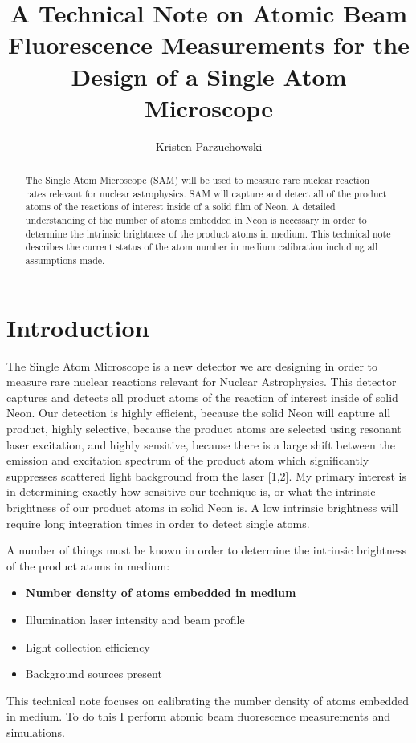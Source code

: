 \documentclass[12pt, a4paper]{article}
\title{A Technical Note on Atomic Beam Fluorescence Measurements for the Design of a Single Atom Microscope}
\author{Kristen Parzuchowski}
\begin{document}
\maketitle
\begin{abstract}
The Single Atom Microscope (SAM) will be used to measure rare nuclear reaction rates relevant for nuclear astrophysics. SAM will capture and detect all of the product atoms of the reactions of interest inside of a solid film of Neon. A detailed understanding of the number of atoms embedded in Neon is necessary in order to determine the intrinsic brightness of the product atoms in medium. This technical note describes the current status of the atom number in medium calibration including all assumptions made.
\end{abstract}
\section{Introduction}
The Single Atom Microscope is a new detector we are designing in order to measure rare nuclear reactions relevant for Nuclear Astrophysics. This detector captures and detects all product atoms of the reaction of interest inside of solid Neon. Our detection is highly efficient, because the solid Neon will capture all product, highly selective, because the product atoms are selected using resonant laser excitation, and highly sensitive, because there is a large shift between the emission and excitation spectrum of the product atom which significantly suppresses scattered light background from the laser [1,2]. My primary interest is in determining exactly how sensitive our technique is, or what the intrinsic brightness of our product atoms in solid Neon is. A low intrinsic brightness will require long integration times in order to detect single atoms. 

A number of things must be known in order to determine the intrinsic brightness of the product atoms in medium:
\begin{itemize}
\item \textbf{Number density of atoms embedded in medium}
\item Illumination laser intensity and beam profile
\item Light collection efficiency
\item Background sources present
\end{itemize}
This technical note focuses on calibrating the number density of atoms embedded in medium. To do this I perform atomic beam fluorescence measurements and simulations. 
\end{document}
